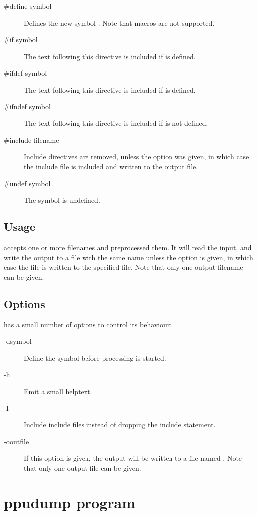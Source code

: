 \begin{description}
\item [\#define symbol] Defines the new symbol . Note that macros are not supported.
\item [\#if symbol] The text following this directive is included if  is defined.
\item [\#ifdef symbol] The text following this directive is included if  is defined. 
\item [\#ifndef symbol] The text following this directive is included if  is not defined.
\item [\#include filename] Include directives are removed, unless the  option was given, 
in which case the include file is included and written to the output file.
\item[\#undef symbol] The symbol  is undefined.
\end{description}

\subsection{Usage}
 accepts one or more filenames and preprocessed them. 
It will read the input, and write the output to a file with the same name 
unless the  option is given, in which case the file is written 
to the specified file. Note that only one output filename can be given.


\subsection{Options}
 has a small number of options to control its behaviour:
\begin{description}
\item[-dsymbol] Define the symbol  before processing is started.
\item[-h] Emit a small helptext.
\item[-I] Include include files instead of dropping the include statement.
\item[-ooutfile] If this option is given, the output will be written to a 
file named . Note that only one output file can be given.
\end{description}

\section{ppudump program}


